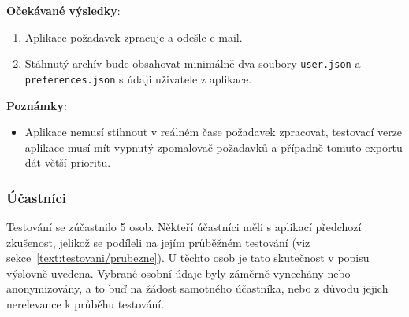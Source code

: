 \textbf{Očekávané výsledky}:

\begin{enumerate}[leftmargin=1.4cm]
    \item Aplikace požadavek zpracuje a odešle e-mail.
    \item Stáhnutý archív bude obsahovat minimálně dva soubory  \verb|user.json| a \verb|preferences.json| s údaji uživatele z aplikace.
\end{enumerate}

\textbf{Poznámky}:

\begin{itemize}[leftmargin=1.4cm]
    \item Aplikace nemusí stihnout v reálném čase požadavek zpracovat, testovací verze aplikace musí mít vypnutý zpomalovač požadavků a případně tomuto exportu dát větší prioritu.
\end{itemize}



\subsubsection{Účastníci}

Testování se zúčastnilo 5 osob. 
Někteří účastníci měli s aplikací předchozí zkušenost, jelikož se podíleli na jejím průběžném testování (viz sekce~\ref{text:testovani/prubezne}). 
U těchto osob je tato skutečnost v popisu výslovně uvedena. 
Vybrané osobní údaje byly záměrně vynechány nebo anonymizovány, a to buď na žádost samotného účastníka, nebo z důvodu jejich nerelevance k průběhu testování.

